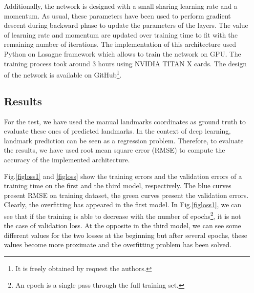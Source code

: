 \documentclass[conference]{IEEEtran}
\begin{document}
Additionally, the network is designed with a small sharing learning rate and a momentum. As usual, these parameters have been used to perform gradient descent during backward phase to update the parameters of the layers. The value of learning rate and momentum are updated over training time to fit with the remaining number of iterations. The implementation of this architecture used Python on Lasagne framework \cite{lasagne} which allows to train the network on GPU. The training process took around 3 hours using NVIDIA TITAN X cards. The design of the network is available on GitHub\footnote{It is freely obtained by request the authors.}.
\subsection{Results}
For the test, we have used the manual landmarks coordinates as ground truth to evaluate these ones of predicted landmarks. In the context of deep learning, landmark prediction can be seen as a regression problem. Therefore, to evaluate the results, we have used root mean square error (RMSE) to compute the accuracy of the implemented architecture. 

Fig.\ref{figloss1} and \ref{figloss} show the training errors and the validation errors of a training time on the first and the third model, respectively. The blue curves present RMSE on training dataset, the green curves present the validation errors. Clearly, the overfitting has appeared in the first model. In Fig.\ref{figloss1}, we can see that if the training is able to decrease with the number of epochs\footnote{An epoch is a single pass through the full training set.}, it is not the case of validation loss. At the opposite in the third model, we can see some different values for the two losses at the beginning but after several epochs, these values become more proximate and the overfitting problem has been solved.
\end{document}
